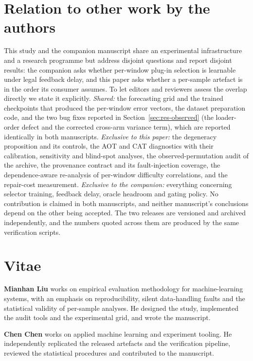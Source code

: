 \documentclass[a4paper,fleqn]{cas-sc}
\begin{document}
\section*{Relation to other work by the authors}
This study and the companion manuscript \citep{companion2026} share an
experimental infrastructure and a research programme but address disjoint
questions and report disjoint results: the companion asks whether per-window
plug-in selection is learnable under legal feedback delay, and this paper asks
whether a per-sample artefact is in the order its consumer assumes. To let
editors and reviewers assess the overlap directly we state it explicitly.
\emph{Shared:} the forecasting grid and the trained checkpoints that produced the
per-window error vectors, the dataset preparation code, and the two bug fixes
reported in Section~\ref{sec:res-observed} (the loader-order defect and the corrected
cross-arm variance term), which are reported identically in both manuscripts.
\emph{Exclusive to this paper:} the degeneracy proposition and its controls, the
AOT and CAT diagnostics with their calibration, sensitivity and blind-spot
analyses, the observed-permutation audit of the archive, the provenance contract
and its fault-injection coverage, the dependence-aware re-analysis of per-window
difficulty correlations, and the repair-cost measurement.
\emph{Exclusive to the companion:} everything concerning selector training,
feedback delay, oracle headroom and gating policy. No contribution is claimed in
both manuscripts, and neither manuscript's conclusions depend on the other being
accepted. The two releases are versioned and archived independently, and the
numbers quoted across them are produced by the same verification scripts.

\section*{Vitae}
\noindent\textbf{Mianhan Liu} works on empirical evaluation methodology for
machine-learning systems, with an emphasis on reproducibility, silent data-handling
faults and the statistical validity of per-sample analyses. He designed the study,
implemented the audit tools and the experimental grid, and wrote the manuscript.

\noindent\textbf{Chen Chen} works on applied machine learning and experiment
tooling. He independently replicated the released artefacts and the verification
pipeline, reviewed the statistical procedures and contributed to the manuscript.
\end{document}
